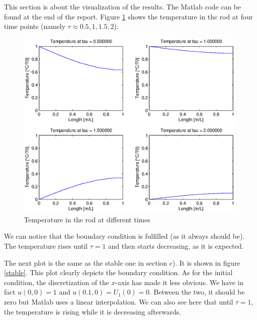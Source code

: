 This section is about the visualization of the results. The Matlab code can be found at the end of the report. Figure \ref{four} shows the temperature in the rod at four time points (namely $\tau \approx 0.5,1,1.5,2$).

\begin{figure}
\begin{center}
\includegraphics[scale=0.5]{four.eps}
\caption{Temperature in the rod at different times}
\label{four}
\end{center}
\end{figure}

We can notice that the boundary condition is fulfilled (as it always should be). The temperature rises until $\tau = 1$ and then starts decreasing, as it is expected. 

The next plot is the same as the stable one in section c). It is shown in figure \ref{stable}. This plot clearly depicts the boundary condition. As for the initial condition, the discretization of the $x$-axis has made it less obvious. We have in fact $u(0,0)=1$ and $u(0.1,0) = U_1(0) = 0$. Between the two, it should be zero but Matlab uses a linear interpolation. We can also see here that until $\tau=1$, the temperature is rising while it is decreasing afterwards.

